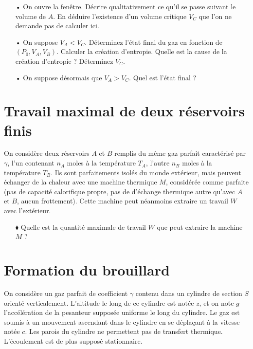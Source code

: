 \documentclass{report}
\begin{document}
\begin{itemize}
\item[•] On ouvre la fenêtre. Décrire qualitativement ce qu'il se passe suivant le volume de $A$. En déduire l'existence d'un volume critique $V_C$ que l'on ne demande pas de calculer ici.

\item[•] On suppose $V_A<V_C$. Déterminez l'état final du gaz en fonction de $(P_0, V_A, V_B)$. Calculer la création d'entropie. Quelle est la cause de la création d'entropie ? Déterminez $V_C$.

\item[•] On suppose désormais que $V_A>V_C$. Quel est l'état final ?

\end{itemize}

\newpage

\section*{Travail maximal de deux réservoirs finis}

On considère deux réservoirs $A$ et $B$ remplis du même gaz parfait caractérisé par $\gamma$, l'un contenant $n_A$ moles à la température $T_A$, l'autre $n_B$ moles à la température $T_B$. Ils sont parfaitements isolés du monde extérieur, mais peuvent échanger de la chaleur avec une machine thermique $M$, considérée comme parfaite (pas de capacité calorifique propre, pas de d'échange thermique autre qu'avec $A$ et $B$, aucun frottement). Cette machine peut néanmoins extraire un travail $W$ avec l'extérieur. 

\begin{itemize}
\item[$\blacklozenge$] Quelle est la quantité maximale de travail $W$ que peut extraire la machine $M$ ?
\end{itemize}

\newpage

\section*{Formation du brouillard}

On considère un gaz parfait de coefficient $\gamma$ contenu dans un cylindre de section $S$ orienté verticalement. L'altitude le long de ce cylindre est notée $z$, et on note $g$ l'accélération de la pesanteur supposée uniforme le long du cylindre. Le gaz est soumis à un mouvement ascendant dans le cylindre en se déplaçant à la vitesse notée $c$. Les parois du cylindre ne permettent pas de transfert thermique. L'écoulement est de plus supposé stationnaire.
\end{document}
